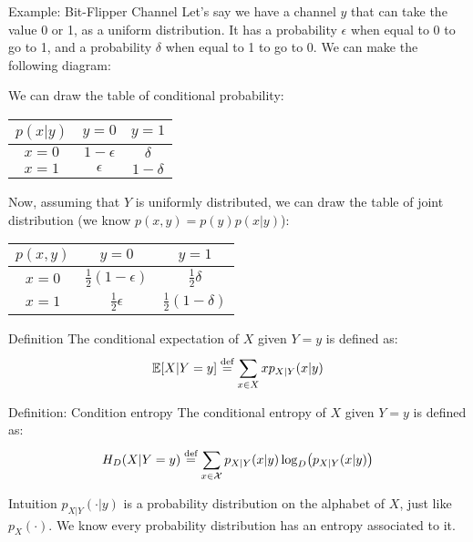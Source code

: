 \documentclass[a4paper]{article}
\begin{document}
\begin{parag}{Example: Bit-Flipper Channel}
    Let's say we have a channel $y$ that can take the value 0 or 1, as a uniform distribution. It has a probability $\epsilon$ when equal to 0 to go to 1, and a probability $\delta$ when equal to 1 to go to 0. We can make the following diagram:

    We can draw the table of conditional probability:
    \begin{center}
    \begin{tabular}{c|cc}
        $p\left(x|y\right)$ & $y = 0$ & $y = 1$ \\
        \hline
        $x = 0$ & $1 - \epsilon$ & $\delta$ \\
        $x = 1$ & $\epsilon$ & $1 - \delta$
    \end{tabular}
    \end{center}

    Now, assuming that $Y$ is uniformly distributed, we can draw the table of joint distribution (we know $p\left(x, y\right) = p\left(y\right)p\left(x|y\right)$):
    \begin{center}
    \begin{tabular}{c|cc}
        $p\left(x, y\right)$ & $y = 0$ & $y = 1$ \\
        \hline
        $x = 0$ & $\frac{1}{2}\left(1 - \epsilon\right)$ & $\frac{1}{2}\delta$ \\
        $x = 1$ & $\frac{1}{2}\epsilon$ & $\frac{1}{2}\left(1 - \delta\right)$
    \end{tabular}
    \end{center}
\end{parag}

\begin{parag}{Definition}
    The conditional expectation of $X$ given $Y = y$ is defined as:
    \[\exval\left[X |Y = y\right] \over{=}{def} \sum_{x \in X}^{} xp_{X|Y}\left(x | y\right)\]
\end{parag}


\begin{parag}{Definition: Condition entropy}
    The conditional entropy of $X$ given $Y = y$ is defined as:
    \[H_D\left(X|Y=y\right) \over{=}{def} \sum_{x \in \mathcal{X}}^{} p_{X|Y}\left(x|y\right) \log_D\left(p_{X|Y}\left(x|y\right)\right)\]

    \begin{subparag}{Intuition}
        $p_{X|Y}\left(\cdot|y\right)$ is a probability distribution on the alphabet of $X$, just like $p_X\left(\cdot\right)$. We know every probability distribution has an entropy associated to it.
    \end{subparag}
\end{parag}
\end{document}
